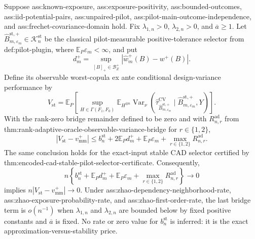 Suppose ass:known-exposure, ass:exposure-positivity, ass:bounded-outcomes, ass:iid-potential-pairs, ass:unpaired-pilot, ass:pilot-main-outcome-independence, and ass:frechet-covariance-domain hold.  Fix \(\lambda_{1,n}>0\), \(\lambda_{2,n}>0\), and \(\overline a\ge1\).  Let \(\widehat B_{m,\varepsilon_m}^{\mathrm{st},+}\in\mathcal K_n^{\mathrm{st}}\) be the classical pilot-measurable positive-tolerance selector from def:pilot-plugin, where \(\mathbb E_P\varepsilon_m<\infty\), and put
\[
d_m^+=\sup_{[B]_+\in\mathcal B_Z^+}
\left|\widehat w_m^+(B)-w^+(B)\right|.
\]
Define its observable worst-copula ex ante conditional design-variance performance by
\[
V_{\mathrm{st}}
=\mathbb E_P\left[
\sup_{H\in\Gamma(F_1,F_0)}
\mathbb E_{H^{\otimes n}}
\operatorname{Var}_\nu\!\left(
\widehat\tau_{\widehat B_{m,\varepsilon_m}^{\mathrm{st},+}}^{\mathrm{CV}}
\mid \widehat B_{m,\varepsilon_m}^{\mathrm{st},+},Y
\right)
\right].
\]
With the rank-zero bridge remainder defined to be zero and with \(R_{n,r}^{\mathrm{ad}}\) from thm:rank-adaptive-oracle-observable-variance-bridge for \(r\in\{1,2\}\),
\[
\left|V_{\mathrm{st}}-v_{\mathrm{mm}}^+\right|
\le b_n^{\mathrm{st}}
+2\mathbb E_Pd_m^+
+\mathbb E_P\varepsilon_m
+\max_{r\in\{1,2\}}R_{n,r}^{\mathrm{ad}}.
\]
The same conclusion holds for the exact-input stable CAD selector certified by thm:encoded-cad-stable-pilot-selector-certificate.  Consequently,
\[
n\left\{
b_n^{\mathrm{st}}+\mathbb E_Pd_m^+
+\mathbb E_P\varepsilon_m
+\max_{r\in\{1,2\}}R_{n,r}^{\mathrm{ad}}
\right\}\longrightarrow0
\]
implies \(n|V_{\mathrm{st}}-v_{\mathrm{mm}}^+|\to0\).  Under ass:zhao-dependency-neighborhood-rate, ass:zhao-exposure-probability-rate, and ass:zhao-first-order-rate, the last bridge term is \(o(n^{-1})\) when \(\lambda_{1,n}\) and \(\lambda_{2,n}\) are bounded below by fixed positive constants and \(\overline a\) is fixed.  No rate or zero value for \(b_n^{\mathrm{st}}\) is inferred: it is the exact approximation-versus-stability price.